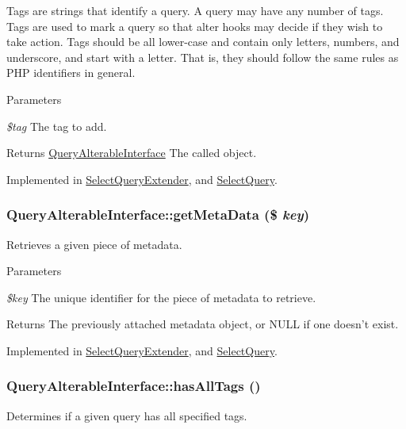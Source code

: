 Tags are strings that identify a query. A query may have any number of tags. Tags are used to mark a query so that alter hooks may decide if they wish to take action. Tags should be all lower-\/case and contain only letters, numbers, and underscore, and start with a letter. That is, they should follow the same rules as PHP identifiers in general.


\begin{DoxyParams}{Parameters}
\item[{\em \$tag}]The tag to add.\end{DoxyParams}
\begin{DoxyReturn}{Returns}
\hyperlink{interfaceQueryAlterableInterface}{QueryAlterableInterface} The called object. 
\end{DoxyReturn}


Implemented in \hyperlink{classSelectQueryExtender_a3b2d7ff719982bd817dbe29d98c732db}{SelectQueryExtender}, and \hyperlink{classSelectQuery_a2efa69685cefbe98f824f5c5e97e092f}{SelectQuery}.\hypertarget{interfaceQueryAlterableInterface_aad1aabcc6d07374eafaf1b47f911121a}{
\subsubsection[{getMetaData}]{\setlength{\rightskip}{0pt plus 5cm}QueryAlterableInterface::getMetaData (\$ {\em key})}}
\label{interfaceQueryAlterableInterface_aad1aabcc6d07374eafaf1b47f911121a}
Retrieves a given piece of metadata.


\begin{DoxyParams}{Parameters}
\item[{\em \$key}]The unique identifier for the piece of metadata to retrieve.\end{DoxyParams}
\begin{DoxyReturn}{Returns}
The previously attached metadata object, or NULL if one doesn't exist. 
\end{DoxyReturn}


Implemented in \hyperlink{classSelectQueryExtender_a55a9736afef5f69e0e247d16d894b908}{SelectQueryExtender}, and \hyperlink{classSelectQuery_aa153d7f1e6960d96e1c794747de1141d}{SelectQuery}.\hypertarget{interfaceQueryAlterableInterface_a752e1b07ff69e4807fcaeab1aa172c57}{
\subsubsection[{hasAllTags}]{\setlength{\rightskip}{0pt plus 5cm}QueryAlterableInterface::hasAllTags ()}}
\label{interfaceQueryAlterableInterface_a752e1b07ff69e4807fcaeab1aa172c57}
Determines if a given query has all specified tags.


